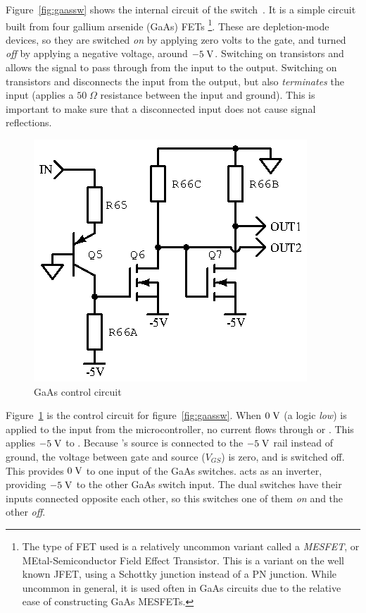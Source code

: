 Figure~\ref{fig:gaassw} shows the internal circuit of the
switch~\cite{maswss0162}.  It is a simple circuit built from four gallium
arsenide (GaAs) FETs \footnote{The type of FET used is a relatively uncommon
    variant called a \emph{MESFET}, or MEtal-Semiconductor Field Effect
Transistor. This is a variant on the well known JFET, using a Schottky junction
instead of a PN junction. While uncommon in general, it is used often in GaAs
circuits due to the relative ease of constructing GaAs MESFETs.}.  These are
depletion-mode devices, so they are switched \emph{on} by applying zero volts
to the gate, and turned \emph{off} by applying a negative voltage, around
$-5\;\mathrm{V}$.  Switching on transistors  and  allows the
signal to pass through from the input to the output. Switching on transistors
 and  disconnects the input from the output, but also
\emph{terminates} the input (applies a $50\;\Omega$ resistance between the
input and ground). This is important to make sure that a disconnected input
does not cause signal reflections.

\begin{figure}[H]
\centering
\includegraphics{gaasctl}
\caption{GaAs control circuit}
\label{fig:gaasctl}
\end{figure}

Figure~\ref{fig:gaasctl} is the control circuit for figure~\ref{fig:gaassw}.
When $0\;\mathrm{V}$ (a logic \emph{low}) is applied to the input from the
microcontroller, no current flows through  or .
This applies $-5\;\mathrm{V}$ to . Because 's source is
connected to the $-5\;\mathrm{V}$ rail instead of ground, the voltage between gate
and source ($V_{GS}$) is zero, and  is switched off.
This provides $0\;\mathrm{V}$ to one input of the GaAs switches.  acts
as an inverter, providing $-5\;\mathrm{V}$ to the other GaAs switch input. The
dual switches have their inputs connected opposite each other, so this
switches one of them \emph{on} and the other \emph{off}.

